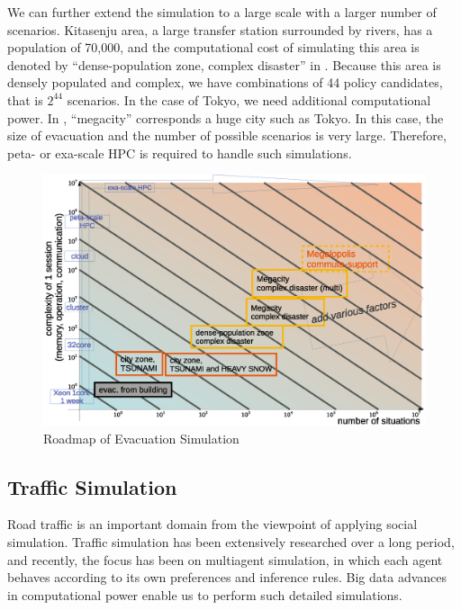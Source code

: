 We can further extend the simulation to a large scale with a larger number of
scenarios.
Kitasenju area, a large transfer station surrounded by rivers,
has a population of 70,000, and the computational cost of simulating this area is
denoted by ``dense-population zone, complex disaster'' in .
Because this area is densely populated and complex, 
we have combinations of 44 policy candidates,
that is $2^{44}$ scenarios.
In the case of Tokyo, we need additional computational power.
In , ``megacity'' corresponds a huge
city such as Tokyo.  In this case, the size of evacuation and the
number of possible scenarios is very large.
Therefore, peta- or exa-scale HPC is required to handle such
simulations.

\begin{figure}
  \centering
  \includegraphics[width=.98\linewidth]{Figs.noda/figure2-4.eps}
  \caption{Roadmap of Evacuation Simulation}
  \label{fig:Figure-4}
\end{figure}

\subsection{Traffic Simulation}
Road traffic is an important domain from the viewpoint of
applying social simulation.
Traffic simulation has been extensively researched over a long period,
and recently,
the focus has been on multiagent simulation,
in which each agent behaves according to its own
preferences and inference rules.
Big data advances in computational power
enable us to perform such detailed simulations.


